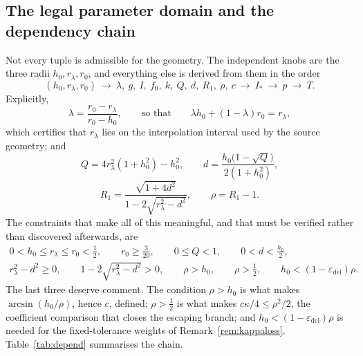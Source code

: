 \documentclass[11pt]{article}
\theoremstyle{plain}
\theoremstyle{definition}
\theoremstyle{remark}
\newcommand{\Istar}{I_{*}}
\newcommand{\epsdel}{\varepsilon_{\mathrm{del}}}
\begin{document}
\subsection{The legal parameter domain and the dependency chain}
\label{sec:domain}

Not every tuple is admissible for the geometry. The independent knobs are the
three radii $h_{0},r_{\lambda},r_{0}$, and everything else is derived from them in
the order
\[
  (h_{0},r_{\lambda},r_{0})
  \ \longrightarrow\
  \lambda,\ g,\ I,\ f_{0},\ k,\ Q,\ d,\ R_{1},\ \rho,\ c
  \ \longrightarrow\
  \Istar
  \ \longrightarrow\
  p
  \ \longrightarrow\
  T .
\]
Explicitly,
\begin{equation}\label{eq:lambdadef}
  \lambda=\frac{r_{0}-r_{\lambda}}{r_{0}-h_{0}},
  \qquad\text{so that}\qquad
  \lambda h_{0}+(1-\lambda)r_{0}=r_{\lambda},
\end{equation}
which certifies that $r_{\lambda}$ lies on the interpolation interval used by
the source geometry; and
\begin{equation}\label{eq:derived}
  Q=4r_{\lambda}^{2}(1+h_{0}^{2})-h_{0}^{2},
  \qquad
  d=\frac{h_{0}\bigl(1-\sqrt{Q}\bigr)}{2(1+h_{0}^{2})},
\end{equation}
\begin{equation}\label{eq:R1}
  R_{1}=\frac{\sqrt{1+4d^{2}}}{1-2\sqrt{r_{\lambda}^{2}-d^{2}}},
  \qquad
  \rho=R_{1}-1 .
\end{equation}
The constraints that make all of this meaningful, and that must be verified
rather than discovered afterwards, are
\begin{equation}\label{eq:domain}
\begin{gathered}
  0<h_{0}\le r_{\lambda}\le r_{0}<\tfrac12,\qquad r_{0}\ge\tfrac{3}{20},\qquad
  0\le Q<1,\qquad 0<d<\tfrac{h_{0}}{2},\\
  r_{\lambda}^{2}-d^{2}\ge0,\qquad
  1-2\sqrt{r_{\lambda}^{2}-d^{2}}>0,\qquad
  \rho>h_{0},\qquad \rho>\tfrac12,\qquad h_{0}<(1-\epsdel)\rho .
\end{gathered}
\end{equation}
The last three deserve comment. The condition $\rho>h_{0}$ is what makes
$\arcsin(h_{0}/\rho)$, hence $c$, defined; $\rho>\tfrac12$ is what makes
$c\kappa/4\le\rho^{2}/2$, the coefficient comparison that closes the escaping
branch; and $h_{0}<(1-\epsdel)\rho$ is needed for the fixed-tolerance weights of
Remark~\ref{rem:kappaloss}. Table~\ref{tab:depend} summarises the chain.
\end{document}
